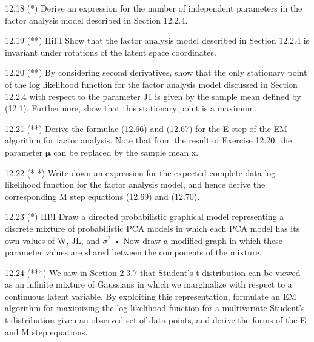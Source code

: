 \documentclass[
  10
]{article}
\begin{document}
12.18 (*) Derive an expression for the number of independent parameters
in the factor analysis model described in Section 12.2.4.

12.19 (**) IIiI!I Show that the factor analysis model described in
Section 12.2.4 is invariant under rotations of the latent space
coordinates.

12.20 (**) By considering second derivatives, show that the only
stationary point of the log likelihood function for the factor analysis
model discussed in Section 12.2.4 with respect to the parameter J1 is
given by the sample mean defined by (12.1). Furthermore, show that this
stationary point is a maximum.

12.21 (**) Derive the formulae (12.66) and (12.67) for the E step of the
EM algorithm for factor analysis. Note that from the result of Exercise
12.20, the parameter \(\pmb { \mu }\) can be replaced by the sample mean
x.

12.22 (* *) Write down an expression for the expected complete-data log
likelihood function for the factor analysis model, and hence derive the
corresponding M step equations (12.69) and (12.70).

12.23 (*) III!I Draw a directed probabilistic graphical model
representing a discrete mixture of probabilistic PCA models in which
each PCA model has its own values of W, JL, and \(\sigma ^ { 2 }\) • Now
draw a modified graph in which these parameter values are shared between
the components of the mixture.

12.24 (***) We saw in Section 2.3.7 that Student's t-distribution can be
viewed as an infinite mixture of Gaussians in which we marginalize with
respect to a continuous latent variable. By exploiting this
representation, formulate an EM algorithm for maximizing the log
likelihood function for a multivariate Student's t-distribution given an
observed set of data points, and derive the forms of the E and M step
equations.
\end{document}

